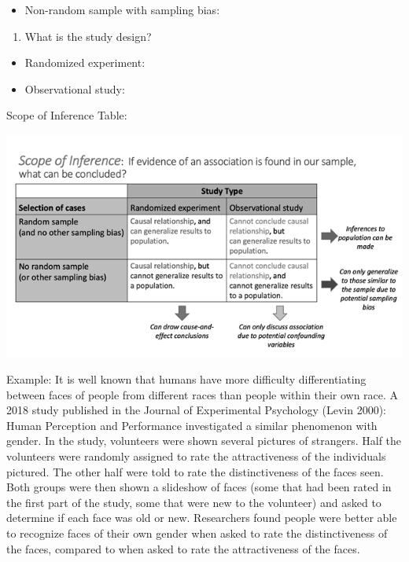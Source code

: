 \documentclass[
]{report}
\providecommand{\tightlist}{%
  \setlength{\itemsep}{0pt}\setlength{\parskip}{0pt}}
\begin{document}
\vspace{0.35in}

\begin{itemize}
\tightlist
\item
  Non-random sample with sampling bias:
\end{itemize}

\vspace{0.35in}

\newpage

\begin{enumerate}
\def\labelenumi{\arabic{enumi}.}
\setcounter{enumi}{1}
\tightlist
\item
  What is the study design?
\end{enumerate}

\begin{itemize}
\tightlist
\item
  Randomized experiment:
\end{itemize}

\vspace{0.35in}

\begin{itemize}
\tightlist
\item
  Observational study:
\end{itemize}

\vspace{0.35in}

Scope of Inference Table:

\begin{center}\includegraphics[width=0.75\linewidth]{images/ScopeOfInferenceGreyscale} \end{center}

Example: It is well known that humans have more difficulty differentiating between faces of people from different races than people within their own race. A 2018 study published in the Journal of Experimental Psychology (Levin 2000): Human Perception and Performance investigated a similar phenomenon with gender. In the study, volunteers were shown several pictures of strangers. Half the volunteers were randomly assigned to rate the attractiveness of the individuals pictured. The other half were told to rate the distinctiveness of the faces seen. Both groups were then shown a slideshow of faces (some that had been rated in the first part of the study, some that were new to the volunteer) and asked to determine if each face was old or new. Researchers found people were better able to recognize faces of their own gender when asked to rate the distinctiveness of the faces, compared to when asked to rate the attractiveness of the faces.
\end{document}
